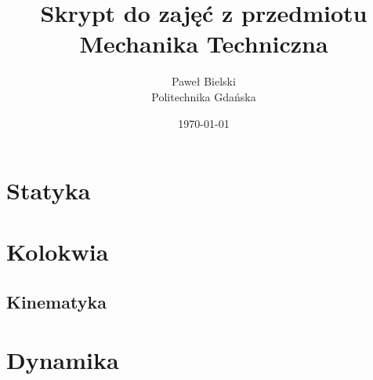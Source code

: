 \documentclass[a4paper]{report}
\title{Skrypt do zajęć z przedmiotu \\ Mechanika Techniczna}
\author{Paweł Bielski \\ Politechnika Gdańska}
\date{\today}
\begin{document}
\maketitle



\chapter{Statyka}


\chapter{Kolokwia}
\section{Kinematyka}


\chapter{Dynamika}

\end{document}
